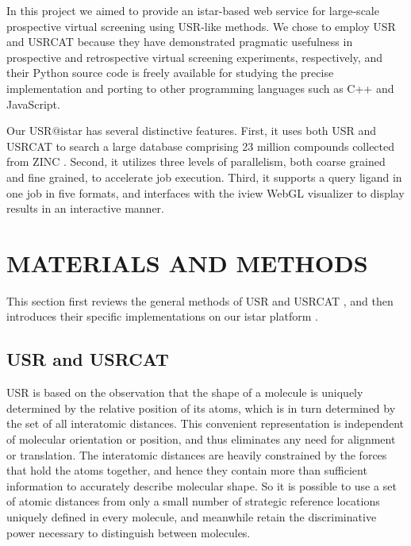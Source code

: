 \documentclass[a4,center,fleqn]{NAR}
\begin{document}
In this project we aimed to provide an istar-based \cite{1362} web service for large-scale prospective virtual screening using USR-like methods. We chose to employ USR \cite{1379} and USRCAT \cite{1331} because they have demonstrated pragmatic usefulness in prospective \cite{1380,1281,1504,1502,1615} and retrospective \cite{1331} virtual screening experiments, respectively, and their Python source code is freely available for studying the precise implementation and porting to other programming languages such as C++ and JavaScript.

Our USR@istar has several distinctive features. First, it uses both USR and USRCAT to search a large database comprising 23 million compounds collected from ZINC \cite{532,1178}. Second, it utilizes three levels of parallelism, both coarse grained and fine grained, to accelerate job execution. Third, it supports a query ligand in one job in five formats, and interfaces with the iview \cite{1366} WebGL visualizer to display results in an interactive manner.

\section{MATERIALS AND METHODS}

This section first reviews the general methods of USR \cite{1379} and USRCAT \cite{1331}, and then introduces their specific implementations on our istar platform \cite{1362}.

\subsection{USR and USRCAT}

USR is based on the observation that the shape of a molecule is uniquely determined by the relative position of its atoms, which is in turn determined by the set of all interatomic distances. This convenient representation is independent of molecular orientation or position, and thus eliminates any need for alignment or translation. The interatomic distances are heavily constrained by the forces that hold the atoms together, and hence they contain more than sufficient information to accurately describe molecular shape. So it is possible to use a set of atomic distances from only a small number of strategic reference locations uniquely defined in every molecule, and meanwhile retain the discriminative power necessary to distinguish between molecules.
\end{document}
